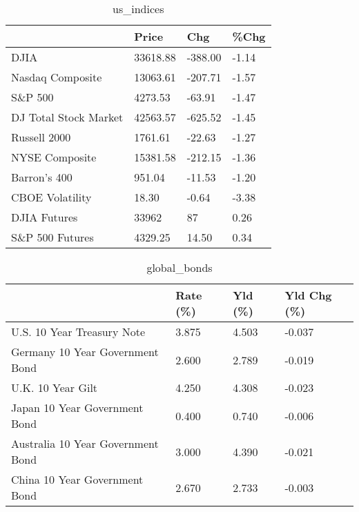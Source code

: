 \documentclass{article}%
\begin{document}
%


\begin{table}[htbp]%
\caption{us\_indices}%
\centering%
\begin{adjustbox}{width=1\textwidth}%
\begin{tabular}{llll}
\toprule
                      &    Price &     Chg &  \%Chg \\
\midrule
                 DJIA & 33618.88 & -388.00 & -1.14 \\
     Nasdaq Composite & 13063.61 & -207.71 & -1.57 \\
              S\&P 500 &  4273.53 &  -63.91 & -1.47 \\
DJ Total Stock Market & 42563.57 & -625.52 & -1.45 \\
         Russell 2000 &  1761.61 &  -22.63 & -1.27 \\
       NYSE Composite & 15381.58 & -212.15 & -1.36 \\
         Barron's 400 &   951.04 &  -11.53 & -1.20 \\
      CBOE Volatility &    18.30 &   -0.64 & -3.38 \\
         DJIA Futures &    33962 &      87 &  0.26 \\
      S\&P 500 Futures &  4329.25 &   14.50 &  0.34 \\
\bottomrule
\end{tabular}
%
\end{adjustbox}%
\end{table}

%


\begin{table}[htbp]%
\caption{global\_bonds}%
\centering%
\begin{adjustbox}{width=1\textwidth}%
\begin{tabular}{llll}
\toprule
                                  & Rate (\%) & Yld (\%) & Yld Chg (\%) \\
\midrule
       U.S. 10 Year Treasury Note &    3.875 &   4.503 &      -0.037 \\
  Germany 10 Year Government Bond &    2.600 &   2.789 &      -0.019 \\
                U.K. 10 Year Gilt &    4.250 &   4.308 &      -0.023 \\
    Japan 10 Year Government Bond &    0.400 &   0.740 &      -0.006 \\
Australia 10 Year Government Bond &    3.000 &   4.390 &      -0.021 \\
    China 10 Year Government Bond &    2.670 &   2.733 &      -0.003 \\
\bottomrule
\end{tabular}
%
\end{adjustbox}%
\end{table}
\end{document}
